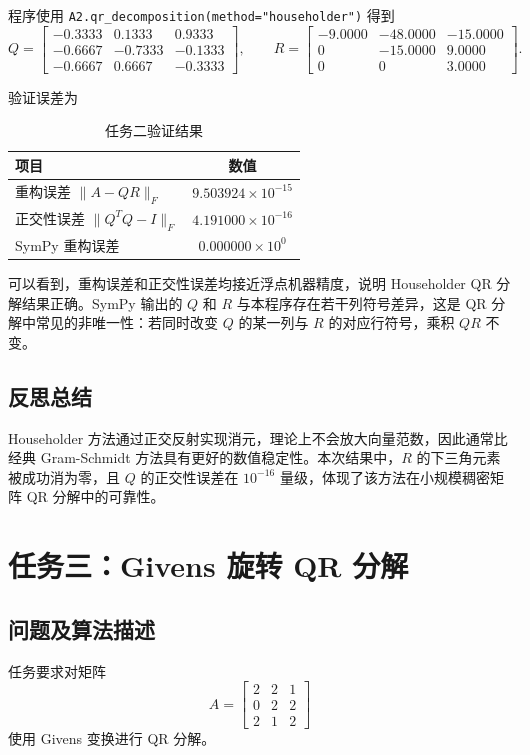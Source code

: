 \documentclass[UTF8,zihao=-4]{ctexart}
\begin{document}
程序使用 \texttt{A2.qr\_decomposition(method="householder")} 得到
\[
Q=\begin{bmatrix}
-0.3333&0.1333&0.9333\\
-0.6667&-0.7333&-0.1333\\
-0.6667&0.6667&-0.3333
\end{bmatrix},
\qquad
R=\begin{bmatrix}
-9.0000&-48.0000&-15.0000\\
0&-15.0000&9.0000\\
0&0&3.0000
\end{bmatrix}.
\]

验证误差为
\begin{table}[H]
\centering
\caption{任务二验证结果}
\begin{tabular}{lc}
\toprule
项目 & 数值 \\
\midrule
重构误差 $\|A-QR\|_F$ & $9.503924\times 10^{-15}$ \\
正交性误差 $\|Q^TQ-I\|_F$ & $4.191000\times 10^{-16}$ \\
SymPy 重构误差 & $0.000000\times 10^{0}$ \\
\bottomrule
\end{tabular}
\end{table}

可以看到，重构误差和正交性误差均接近浮点机器精度，说明 Householder QR 分解结果正确。SymPy 输出的 $Q$ 和 $R$ 与本程序存在若干列符号差异，这是 QR 分解中常见的非唯一性：若同时改变 $Q$ 的某一列与 $R$ 的对应行符号，乘积 $QR$ 不变。

\subsection{反思总结}

Householder 方法通过正交反射实现消元，理论上不会放大向量范数，因此通常比经典 Gram-Schmidt 方法具有更好的数值稳定性。本次结果中，$R$ 的下三角元素被成功消为零，且 $Q$ 的正交性误差在 $10^{-16}$ 量级，体现了该方法在小规模稠密矩阵 QR 分解中的可靠性。

\section{任务三：Givens 旋转 QR 分解}

\subsection{问题及算法描述}

任务要求对矩阵
\[
A=\begin{bmatrix}
2&2&1\\
0&2&2\\
2&1&2
\end{bmatrix}
\]
使用 Givens 变换进行 QR 分解。
\end{document}
